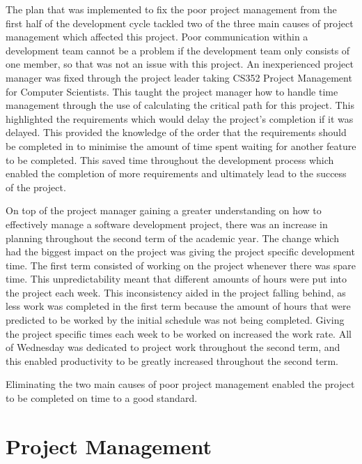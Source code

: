 \documentclass{article}
\begin{document}
The plan that was implemented to fix the poor project management from the first half of the development cycle tackled two of the three main causes of project management which affected this project. Poor communication within a development team cannot be a problem if the development team only consists of one member, so that was not an issue with this project. An inexperienced project manager was fixed through the project leader taking CS352 Project Management for Computer Scientists. This taught the project manager how to handle time management through the use of calculating the critical path for this project. This highlighted the requirements which would delay the project's completion if it was delayed. This provided the knowledge of the order that the requirements should be completed in to minimise the amount of time spent waiting for another feature to be completed. This saved time throughout the development process which enabled the completion of more requirements and ultimately lead to the success of the project. \par 

On top of the project manager gaining a greater understanding on how to effectively manage a software development project, there was an increase in planning throughout the second term of the academic year. The change which had the biggest impact on the project was giving the project specific development time. The first term consisted of working on the project whenever there was spare time. This unpredictability meant that different amounts of hours were put into the project each week. This inconsistency aided in the project falling behind, as less work was completed in the first term because the amount of hours that were predicted to be worked by the initial schedule was not being completed. Giving the project specific times each week to be worked on increased the work rate. All of Wednesday was dedicated to project work throughout the second term, and this enabled productivity to be greatly increased throughout the second term. \par

Eliminating the two main causes of poor project management enabled the project to be completed on time to a good standard. \par

\section{Project Management}
\label{section:projectManagement}
\end{document}
